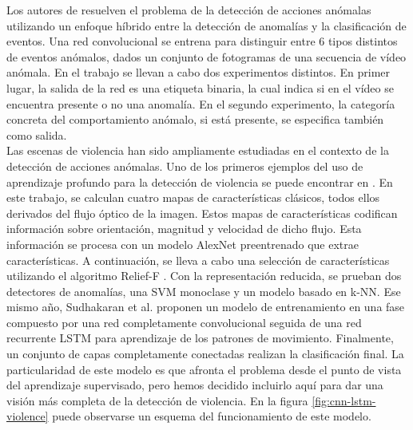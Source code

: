 \documentclass[../main.tex]{memoir}
\begin{document}
Los autores de \cite{tay2019robust} resuelven el problema de la
detección de acciones anómalas utilizando un enfoque híbrido entre
la detección de anomalías y la clasificación de eventos. Una red
convolucional se entrena para distinguir entre 6 tipos distintos
de eventos anómalos, dados un conjunto de fotogramas de una secuencia
de vídeo anómala. En el trabajo se llevan a cabo dos experimentos
distintos. En primer lugar, la salida de la red es una etiqueta
binaria, la cual indica si en el vídeo se encuentra presente o no
una anomalía. En el segundo experimento, la categoría concreta
del comportamiento anómalo, si está presente, se especifica también
como salida.\\

Las escenas de violencia han sido ampliamente estudiadas en el
contexto de la detección de acciones anómalas. Uno de los primeros
ejemplos del uso de aprendizaje profundo para la detección de
violencia se puede encontrar en \cite{kecceli2017violent}. En este
trabajo, se calculan cuatro mapas de características clásicos, todos
ellos derivados del flujo óptico de la imagen. Estos mapas de
características codifican información sobre orientación, magnitud y
velocidad de dicho flujo. Esta información se procesa con un modelo
AlexNet preentrenado que extrae características. A continuación, se
lleva a cabo una selección de características utilizando el algoritmo
Relief-F \cite{kononenko1997overcoming}. Con la representación
reducida, se prueban dos detectores de anomalías, una SVM monoclase y
un modelo basado en k-NN. Ese mismo año, Sudhakaran et
al. \cite{sudhakaran2017learning} proponen un modelo de entrenamiento
en una fase compuesto por una red completamente convolucional seguida
de una red recurrente LSTM para aprendizaje de los patrones de
movimiento. Finalmente, un conjunto de capas completamente conectadas
realizan la clasificación final. La particularidad de este modelo es
que afronta el problema desde el punto de vista del aprendizaje
supervisado, pero hemos decidido incluirlo aquí para dar una visión
más completa de la detección de violencia. En la figura
\ref{fig:cnn-lstm-violence} puede observarse un esquema del
funcionamiento de este modelo.\\
\end{document}
